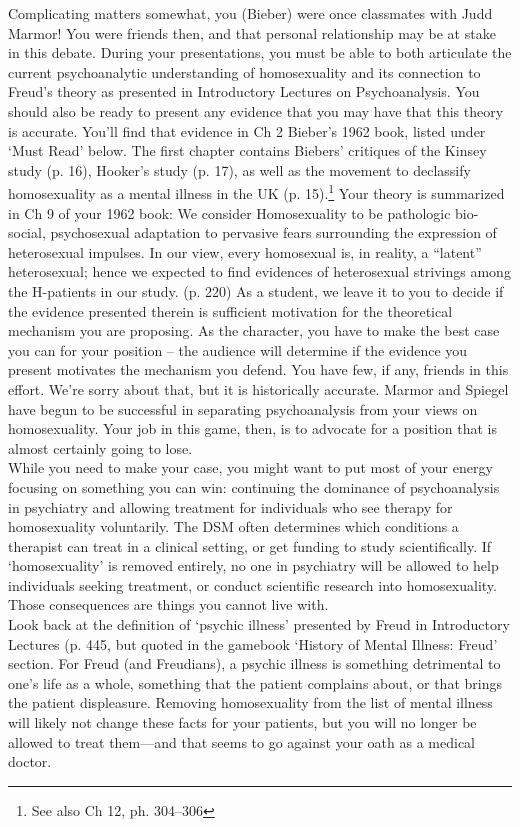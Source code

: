 Complicating matters somewhat, you (Bieber) were once classmates with Judd Marmor! You were friends then, and that personal relationship may be at stake in this debate.
During your presentations, you must be able to both articulate the current psychoanalytic understanding of homosexuality and its connection to Freud's theory as presented in Introductory Lectures on Psychoanalysis. You should also be ready to present any evidence that you may have that this theory is accurate. You'll find that evidence in Ch 2 Bieber's 1962 book, listed under `Must Read' below. The first chapter contains Biebers' critiques of the Kinsey study (p. 16), Hooker's study (p. 17), as well as the movement to declassify homosexuality as a mental illness in the UK (p. 15).\footnote{See also Ch 12, ph. 304--306}
Your theory is summarized in Ch 9 of your 1962 book:
We consider Homosexuality to be pathologic bio-social, psychosexual adaptation to pervasive fears surrounding the expression of heterosexual impulses. In our view, every homosexual is, in reality, a “latent” heterosexual; hence we expected to find evidences of heterosexual strivings among the H-patients in our study. (p. 220)
As a student, we leave it to you to decide if the evidence presented therein is sufficient motivation for the theoretical mechanism you are proposing.
 As the character, you have to make the best case you can for your position – the audience will determine if the evidence you present motivates the mechanism you defend. You have few, if any, friends in this effort. We're sorry about that, but it is historically accurate. Marmor and Spiegel have begun to be successful in separating psychoanalysis from your views on homosexuality. Your job in this game, then, is to advocate for a position that is almost certainly going to lose.\\
While you need to make your case, you might want to put most of your energy focusing on something you can win: continuing the dominance of psychoanalysis in psychiatry and allowing treatment for individuals who see therapy for homosexuality voluntarily. The DSM often determines which conditions a therapist can treat in a clinical setting, or get funding to study scientifically. If `homosexuality' is removed entirely, no one in psychiatry will be allowed to help individuals seeking treatment, or conduct scientific research into homosexuality. Those consequences are things you cannot live with.\\
Look back at the definition of `psychic illness' presented by Freud in Introductory Lectures (p. 445, but quoted in the gamebook `History of Mental Illness: Freud' section. For Freud (and Freudians), a psychic illness is something detrimental to one's life as a whole, something that the patient complains about, or that brings the patient displeasure. Removing homosexuality from the list of mental illness will likely not change these facts for your patients, but you will no longer be allowed to treat them—and that seems to go against your oath as a medical doctor.
